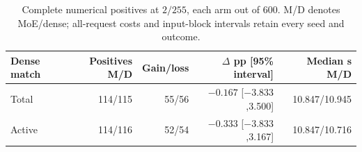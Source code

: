 \begin{table}[ht]
\centering\small
\begin{tabular}{lrrrr}
\toprule
Dense match & Positives M/D & Gain/loss & $\Delta$ pp [95\% interval] & Median s M/D\\
\midrule
Total & 114/115 & 55/56 & $-0.167$ [$-3.833$,3.500] & 10.847/10.945\\
Active & 114/116 & 52/54 & $-0.333$ [$-3.833$,3.167] & 10.847/10.716\\
\bottomrule
\end{tabular}
\caption{Complete numerical positives at $2/255$, each arm out of 600. M/D denotes MoE/dense; all-request costs and input-block intervals retain every seed and outcome.}
\label{tab:s1primary}
\end{table}

